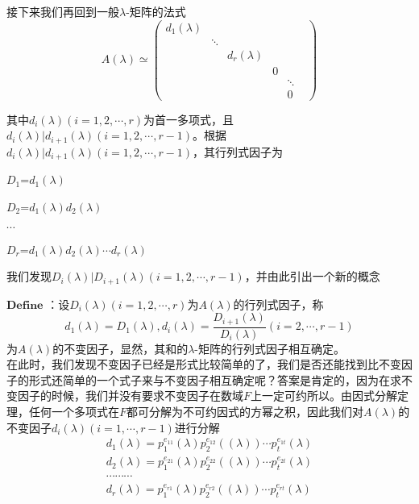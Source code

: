 \documentclass[a4paper,12pt]{book}
\begin{document}
接下来我们再回到一般$\lambda$-矩阵的法式
\begin{equation*}
	\mathit{A}(\lambda)\simeq 
	\begin{pmatrix}
		d_{1}(\lambda ) &  &  &  &  & \\
		&  \ddots &  &  &  & \\
		&  &  d_{r}(\lambda )&  &  & \\
		&  &  &  0&  & \\
		&  &  &  &  \ddots & \\
		&  &  &  &  0&
	\end{pmatrix}
\end{equation*}


其中$d_{i}(\lambda )(i=1,2,\cdots,r)$为首一多项式，且$d_{i}(\lambda )|d_{i+1}(\lambda )(i=1,2,\cdots,r-1)$。根据$d_{i}(\lambda )|d_{i+1}(\lambda )(i=1,2,\cdots,r-1)$，其行列式因子为

$\mathit{D_{1}}$=$d_{1}(\lambda )$

$\mathit{D_{2}}$=$d_{1}(\lambda )d_{2}(\lambda )$

$\cdots$

$\mathit{D_{r}}$=$d_{1}(\lambda )d_{2}(\lambda )\cdots d_{r}(\lambda )$

我们发现$D_{i}(\lambda )|D_{i+1}(\lambda )(i=1,2,\cdots,r-1)$，并由此引出一个新的概念

$\mathbf{Define}$ ：设$D_{i}(\lambda )(i=1,2,\cdots,r)$为$\mathit{A}(\lambda)$的行列式因子，称
\begin{equation*}
	d_{1}(\lambda)=D_{1}(\lambda),  
		d_{i}(\lambda)=\frac{D_{i+1}(\lambda )}{D_{i}(\lambda )}(i=2,\cdots,r-1)
\end{equation*}
为$\mathit{A}(\lambda)$的不变因子，显然，其和的$\lambda$-矩阵的行列式因子相互确定。~\\


在此时，我们发现不变因子已经是形式比较简单的了，我们是否还能找到比不变因子的形式还简单的一个式子来与不变因子相互确定呢？答案是肯定的，因为在求不变因子的时候，我们并没有要求不变因子在数域$\mathit{F}$上一定可约所以。由因式分解定理，任何一个多项式在$\mathit{F}$都可分解为不可约因式的方幂之积，因此我们对$\mathit{A}(\lambda)$的不变因子$d_{i}(\lambda)(i=1,\cdots,r-1)$进行分解
\begin{equation*}
	\begin{split}
	d_{1}(\lambda)=p_{1}^{e_{11}}(\lambda)p_{2}^{e_{12}}((\lambda))\cdots p_{t}^{e_{1t}}(\lambda)\\
	d_{2}(\lambda)=p_{1}^{e_{21}}(\lambda)p_{2}^{e_{22}}((\lambda))\cdots p_{t}^{e_{2t}}(\lambda)\\
	\cdots \cdots \cdots\\
		d_{r}(\lambda)=p_{1}^{e_{r1}}(\lambda)p_{2}^{e_{r2}}((\lambda))\cdots p_{t}^{e_{rt}}(\lambda)
\end{split}
\end{equation*}
\end{document}
